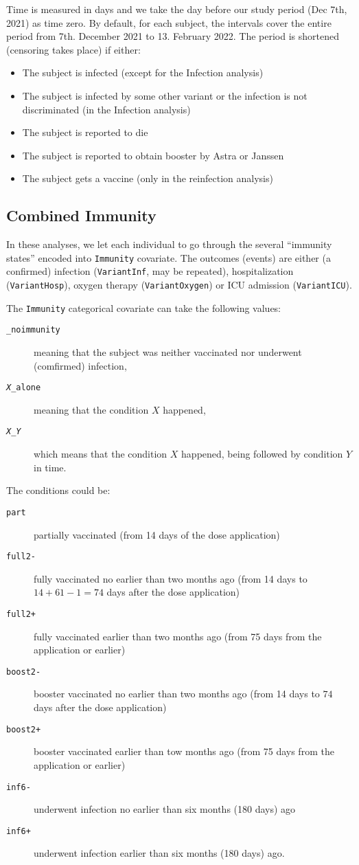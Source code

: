 \documentclass[9pt,onecolumn,twoside,lineno]{pnas-new}
\begin{document}
Time is measured in days and we take the day before our study period (Dec 7th, 2021) as time zero. By default, for each subject, the intervals cover the entire period from 7th. December 2021 to 13. February 2022. The period is shortened (censoring takes place) if either:
\begin{itemize} 
\item The subject is infected (except for the Infection analysis)
\item The subject is infected by some other variant or the infection is not discriminated (in the Infection analysis)
\item The subject is reported to die
\item The subject is reported to obtain booster by Astra or Janssen
\item The subject gets a vaccine (only in the reinfection analysis)
\end{itemize}


\subsection*{Combined Immunity}
In these analyses,
we let each individual to go through the several ``immunity states'' encoded into {\tt Immunity} covariate. The outcomes (events) are either (a confirmed) infection ({\tt VariantInf}, may be repeated), hospitalization ({\tt VariantHosp}), oxygen therapy ({\tt VariantOxygen}) or ICU admission ({\tt VariantICU}).

The {\tt Immunity} categorical covariate can take the following values:
\begin{description}
\item[{\tt \_noimmunity}] meaning that the subject was neither vaccinated nor underwent (comfirmed) infection,
\item[{\tt {\em X}\_alone}] meaning that the condition $X$ happened,
\item[{\tt {\em X}\_{\em Y}}] which means that the condition $X$ happened, being followed by condition $Y$ in time. 
\end{description}

The conditions could be:
\begin{description}
\item[{\tt part}] partially vaccinated (from 14 days of the dose application)
\item[{\tt full2-}] fully vaccinated no earlier than two months ago (from 14 days to $14+61-1=74$ days after the dose application)
\item[{\tt full2+}] fully vaccinated earlier than two months ago (from 75 days from the application or earlier)
\item[{\tt boost2-}] booster vaccinated no earlier than two months ago (from 14 days to $74$ days after the dose application)
\item[{\tt boost2+}] booster vaccinated earlier than tow months ago (from 75 days from the application or earlier)
\item[{\tt inf6-}] underwent infection no earlier than six months (180 days) ago 
\item[{\tt inf6+}] underwent infection earlier than six months (180 days) ago. \end{description}
\end{document}
